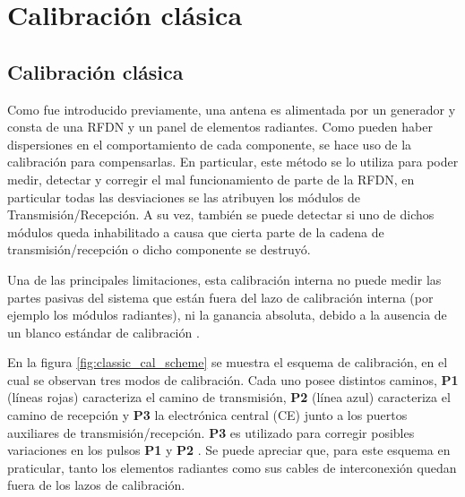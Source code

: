 
\chapter{Calibración clásica}
\label{ch:classicalCalibration}

\section{Calibración clásica}

Como fue introducido previamente, una antena es alimentada por un generador y consta de una RFDN y un panel de elementos 
radiantes. Como pueden haber dispersiones en el comportamiento de cada componente, se hace uso de la calibración para 
compensarlas. En particular, este método se lo utiliza para poder medir, detectar y corregir el mal funcionamiento de parte de 
la RFDN, en particular todas las desviaciones se las atribuyen los módulos de Transmisión/Recepción. A su vez, también se 
puede detectar si uno de dichos módulos queda inhabilitado a causa que cierta parte de la cadena de transmisión/recepción 
o dicho componente se destruyó.

Una de las principales limitaciones, esta calibración interna no puede medir las partes pasivas del sistema que están fuera del
lazo de calibración interna (por ejemplo los módulos radiantes), ni la ganancia absoluta, debido a la ausencia de un blanco 
estándar de calibración \cite{Wang2010}.

En la figura \ref{fig:classic_cal_scheme} se muestra el esquema de calibración, en el cual se observan tres modos de
calibración. Cada uno posee distintos caminos, \textbf{P1} (líneas rojas) caracteriza el camino de transmisión, \textbf{P2}
(línea azul) caracteriza el camino de recepción y \textbf{P3} la electrónica central (CE) junto a los puertos auxiliares de
transmisión/recepción. \textbf{P3} es utilizado para corregir posibles variaciones en los pulsos \textbf{P1} y \textbf{P2}
\cite{Makhoul2012}. Se puede apreciar que, para este esquema en praticular, tanto los elementos radiantes como sus cables de 
interconexión quedan fuera de los lazos de calibración.

